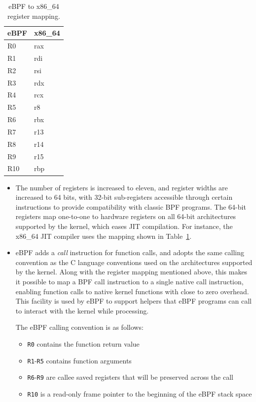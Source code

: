 \documentclass[10pt,sigconf]{acmart}
\begin{document}
\begin{table}[htbp]
\caption{\label{tbl:reg-map}
eBPF to x86\_64 register mapping.}
\centering
\begin{tabular}{ll}
\toprule
eBPF & x86\_64\\
\midrule
R0 & rax\\
R1 & rdi\\
R2 & rsi\\
R3 & rdx\\
R4 & rcx\\
R5 & r8\\
R6 & rbx\\
R7 & r13\\
R8 & r14\\
R9 & r15\\
R10 & rbp\\
\bottomrule
\end{tabular}
\end{table}


\begin{itemize}
\item The number of registers is increased to eleven, and register widths are
increased to 64 bits, with 32-bit sub-registers accessible through certain
instructions to provide compatibility with classic BPF programs. The 64-bit
registers map one-to-one to hardware registers on all 64-bit architectures
supported by the kernel, which eases JIT compilation. For instance, the x86\_64
JIT compiler uses the mapping shown in Table \ref{tbl:reg-map}.

\item eBPF adds a \emph{call} instruction for function calls, and adopts the same calling
convention as the C language conventions used on the architectures supported
by the kernel. Along with the register mapping mentioned above, this makes it
possible to map a BPF call instruction to a single native call instruction,
enabling function calls to native kernel functions with close to zero
overhead. This facility is used by eBPF to support helpers that eBPF programs
can call to interact with the kernel while processing.

The eBPF calling convention is as follows:
\begin{itemize}
\item \texttt{R0} contains the function return value
\item \texttt{R1}-\texttt{R5} contains function arguments
\item \texttt{R6}-\texttt{R9} are callee saved registers that will be preserved across the call
\item \texttt{R10} is a read-only frame pointer to the beginning of the eBPF stack space
\end{itemize}
\end{itemize}
\end{document}
